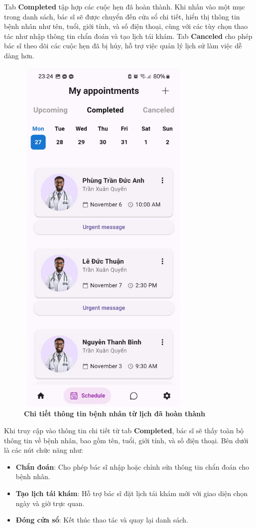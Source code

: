 Tab \textbf{Completed} tập hợp các cuộc hẹn đã hoàn thành. Khi nhấn vào một mục trong danh sách, bác sĩ sẽ được chuyển đến cửa sổ chi tiết, hiển thị thông tin bệnh nhân như tên, tuổi, giới tính, và số điện thoại, cùng với các tùy chọn thao tác như nhập thông tin chẩn đoán và tạo lịch tái khám. Tab \textbf{Canceled} cho phép bác sĩ theo dõi các cuộc hẹn đã bị hủy, hỗ trợ việc quản lý lịch sử làm việc dễ dàng hơn.

\begin{figure}[H]
	\centering
	\includegraphics[width=8.5cm,height=18cm]{Images/AppUI/scheduleCompleted.jpg}
	\caption[Chi tiết thông tin bệnh nhân từ lịch đã hoàn thành]{\bfseries \fontsize{12pt}{0pt}\selectfont Chi tiết thông tin bệnh nhân từ lịch đã hoàn thành}
	\label{patientInfo}
\end{figure}
Khi truy cập vào thông tin chi tiết từ tab \textbf{Completed}, bác sĩ sẽ thấy toàn bộ thông tin về bệnh nhân, bao gồm tên, tuổi, giới tính, và số điện thoại. Bên dưới là các nút chức năng như:
\begin{itemize}
	\item \textbf{Chẩn đoán}: Cho phép bác sĩ nhập hoặc chỉnh sửa thông tin chẩn đoán cho bệnh nhân.
	\item \textbf{Tạo lịch tái khám}: Hỗ trợ bác sĩ đặt lịch tái khám mới với giao diện chọn ngày và giờ trực quan.
	\item \textbf{Đóng cửa sổ}: Kết thúc thao tác và quay lại danh sách.
\end{itemize}

